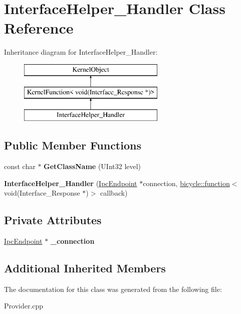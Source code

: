 \hypertarget{class_interface_helper___handler}{}\section{Interface\+Helper\+\_\+\+Handler Class Reference}
\label{class_interface_helper___handler}
Inheritance diagram for Interface\+Helper\+\_\+\+Handler\+:\begin{figure}[H]
\begin{center}
\leavevmode
\includegraphics[height=3.000000cm]{class_interface_helper___handler}
\end{center}
\end{figure}
\subsection*{Public Member Functions}
\begin{DoxyCompactItemize}
\item 
\mbox{\label{class_interface_helper___handler_a7881a353ae89ee45ea31922ebc8c105b}} 
const char $\ast$ {\bfseries Get\+Class\+Name} (U\+Int32 level)
\item 
\mbox{\label{class_interface_helper___handler_a6e47bb18bf5845a4748bd8bec32fc386}} 
{\bfseries Interface\+Helper\+\_\+\+Handler} (\hyperlink{class_ipc_endpoint}{Ipc\+Endpoint} $\ast$connection, \hyperlink{classbicycle_1_1function}{bicycle\+::function}$<$ void(Interface\+\_\+\+Response $\ast$)$>$ callback)
\end{DoxyCompactItemize}
\subsection*{Private Attributes}
\begin{DoxyCompactItemize}
\item 
\mbox{\label{class_interface_helper___handler_a1bdba7b59522f93861c92dcb0b92eaf2}} 
\hyperlink{class_ipc_endpoint}{Ipc\+Endpoint} $\ast$ {\bfseries \+\_\+connection}
\end{DoxyCompactItemize}
\subsection*{Additional Inherited Members}


The documentation for this class was generated from the following file\+:\begin{DoxyCompactItemize}
\item 
Provider.\+cpp\end{DoxyCompactItemize}
